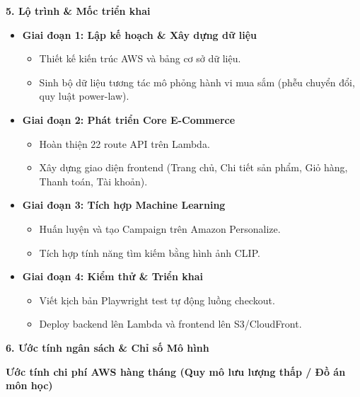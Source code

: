 \vspace{0.5em}\noindent\textbf{5. Lộ trình \& Mốc triển
khai}\par

\begin{itemize}
\tightlist
\item
  \textbf{Giai đoạn 1: Lập kế hoạch \& Xây dựng dữ liệu}

  \begin{itemize}
  \tightlist
  \item
    Thiết kế kiến trúc AWS và bảng cơ sở dữ liệu.
  \item
    Sinh bộ dữ liệu tương tác mô phỏng hành vi mua sắm (phễu chuyển đổi,
    quy luật power-law).
  \end{itemize}
\item
  \textbf{Giai đoạn 2: Phát triển Core E-Commerce}

  \begin{itemize}
  \tightlist
  \item
    Hoàn thiện 22 route API trên Lambda.
  \item
    Xây dựng giao diện frontend (Trang chủ, Chi tiết sản phẩm, Giỏ hàng,
    Thanh toán, Tài khoản).
  \end{itemize}
\item
  \textbf{Giai đoạn 3: Tích hợp Machine Learning}

  \begin{itemize}
  \tightlist
  \item
    Huấn luyện và tạo Campaign trên Amazon Personalize.
  \item
    Tích hợp tính năng tìm kiếm bằng hình ảnh CLIP.
  \end{itemize}
\item
  \textbf{Giai đoạn 4: Kiểm thử \& Triển khai}

  \begin{itemize}
  \tightlist
  \item
    Viết kịch bản Playwright test tự động luồng checkout.
  \item
    Deploy backend lên Lambda và frontend lên S3/CloudFront.
  \end{itemize}
\end{itemize}

\vspace{0.5em}\noindent\textbf{6. Ước tính ngân sách \& Chỉ số Mô
hình}\par

\textbf{Ước tính chi phí AWS hàng tháng (Quy mô lưu lượng thấp / Đồ án
môn học)}

